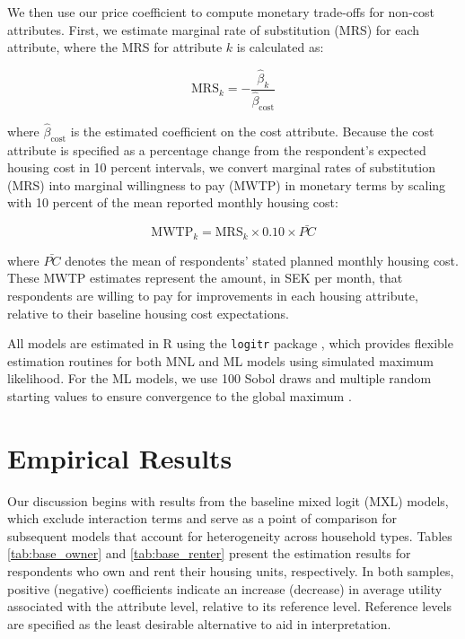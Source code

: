 \documentclass[3p,11pt ]{elsarticle}
\begin{document}
We then use our price coefficient to compute monetary trade-offs for non-cost attributes. 
First,
we estimate marginal rate of substitution (MRS) for each attribute,
where the MRS for attribute \( k \) is calculated as:

\begin{equation}
\text{MRS}_k = -\frac{\hat{\beta}_k}{\hat{\beta}_{\text{cost}}}
\label{eq:mrs}
\end{equation}

\noindent where \( \hat{\beta}_{\text{cost}} \) is the estimated coefficient on the cost attribute.
Because the cost attribute is specified as a percentage change from the respondent’s expected housing cost in 10 percent intervals, we convert marginal rates of substitution (MRS) into marginal willingness to pay (MWTP) in monetary terms by scaling with 10 percent of the mean reported monthly housing cost:

\begin{equation}
\text{MWTP}_k = \text{MRS}_k \times 0.10 \times \bar{PC}
\label{eq:mwtp}
\end{equation}

\noindent where $\bar{PC}$ denotes the mean of respondents' stated planned monthly housing cost.
These MWTP estimates represent the amount, in SEK per month, that respondents are willing to pay for improvements in each housing attribute, relative to their baseline housing cost expectations. 

All models are estimated in R using the \texttt{logitr} package \citep{helvestonLogitrFastEstimation2023}, which provides flexible estimation routines for both MNL and ML models using simulated maximum likelihood.
For the ML models,
we use 100 Sobol draws and multiple random starting values to ensure convergence to the global maximum \citep{trainDiscreteChoiceMethods2003}.




\section{Empirical Results}

Our discussion begins with results from the baseline mixed logit (MXL) models, which exclude interaction terms and serve as a point of comparison for subsequent models that account for heterogeneity across household types. Tables \ref{tab:base_owner} and \ref{tab:base_renter} present the estimation results for respondents who own and rent their housing units, respectively. In both samples, positive (negative) coefficients indicate an increase (decrease) in average utility associated with the attribute level, relative to its reference level. Reference levels are specified as the least desirable alternative to aid in interpretation.
\end{document}
